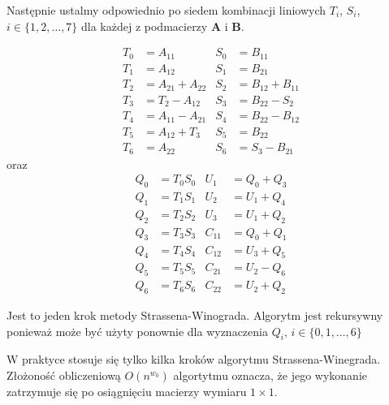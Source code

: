 Następnie ustalmy odpowiednio po siedem kombinacji liniowych \(T_i\), \(S_i\), \(i\in \{1, 2, \dots,7\}\) dla każdej z podmacierzy \(\mathbf{A}\) i \(\mathbf{B}\).

\begin{align*}
T_0& = A_{11}& S_0 &= B_{11}\\
T_1& = A_{12}& S_1 &= B_{21}\\
T_2& = A_{21} + A_{22}& S_2 &= B_{12}+B_{11}\\
T_3& = T_2 - A_{12}& S_3 &= B_{22}-S_2\\
T_4& = A_{11}-A_{21}& S_4 &= B_{22}-B_{12}\\
T_5& = A_{12}+T_3& S_5 &= B_{22}\\
T_6& = A_{22}& S_6 &= S_3-B_{21}
\end{align*}
oraz
\begin{align*}
Q_0& = T_{0}S_{0}& U_1 &= Q_{0} + Q_{3}\\
Q_1& = T_{1}S_{1}& U_2 &= U_{1} + Q_{4}\\
Q_2& = T_{2}S_{2}& U_3 &= U_{1} + Q_{2}\\
Q_3& = T_{3}S_{3}& C_{11} &= Q_{0} + Q_{1}\\
Q_4& = T_{4}S_{4}& C_{12} &= U_{3} + Q_{5}\\
Q_5& = T_{5}S_{5}& C_{21} &= U_{2} - Q_{6}\\
Q_6& = T_{6}S_{6}& C_{22} &= U_{2} + Q_{2}
\end{align*}

Jest to jeden krok metody Strassena-Winograda. Algorytm jest rekursywny ponieważ może być użyty ponownie dla wyznaczenia \(Q_i,\,i\in\{0,1,\dots,6\}\)

W praktyce stosuje się tylko kilka kroków algorytmu Strassena-Winegrada\cite{DBLP:journals/corr/abs-1202-3173}. Złożoność obliczeniową \(O(n^{w_0})\) algortytmu oznacza, że jego wykonanie zatrzymuje się po osiągnięciu macierzy wymiaru \(1\times 1\).
